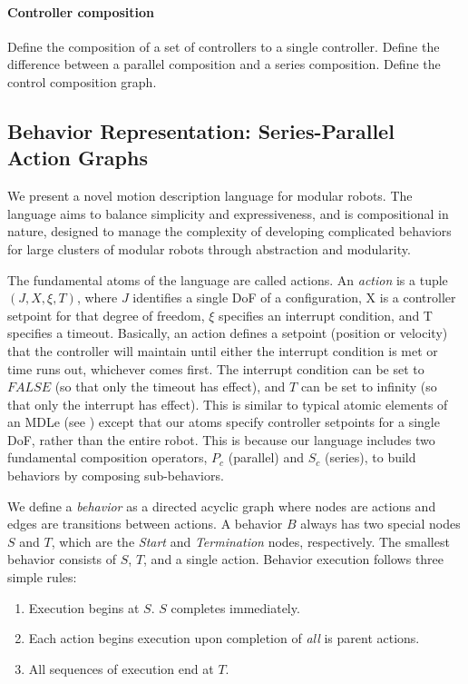 \documentclass[conference]{IEEEtran}
\theoremstyle{definition}
\begin{document}
\paragraph{Controller composition}
Define the composition of a set of controllers to a single controller. Define the difference between a parallel composition and a series composition. Define the control composition graph.

\subsection{Behavior Representation: Series-Parallel Action Graphs}
\label{sec:behavior-representation}
We present a novel motion description language for modular robots.  The
language aims to balance simplicity and expressiveness, and is compositional in
nature, designed to manage the complexity of developing complicated behaviors
for large clusters of modular robots through abstraction and modularity.

The fundamental atoms of the language are called actions.  An \textit{action} is a tuple \(
(J, X, \xi, T)\), where \(J\) identifies a single DoF of a configuration, X is a
controller setpoint for that degree of freedom, \(\xi\) specifies an interrupt
condition, and T specifies a timeout.  Basically, an action defines a setpoint
(position or velocity) that the controller will maintain until either the
interrupt condition is met or time runs out, whichever comes first.  The
interrupt condition can be set to \(FALSE\) (so that only the timeout has effect),
and \(T\) can be set to infinity (so that only the interrupt has effect).  This is
similar to typical atomic elements of an MDLe (see \cite{hristu2003motion}) except that our
atoms specify controller setpoints for a single DoF, rather than the entire
robot.  This is because our language includes two fundamental composition operators,
\(P_c\) (parallel) and \(S_c\) (series), to build behaviors by composing sub-behaviors.

We define a \textit{behavior} as a directed acyclic graph where nodes are actions and
edges are transitions between actions.  A behavior \(B\) always has two
special nodes \(S\) and \(T\), which are the \textit{Start} and \textit{Termination} nodes, respectively.
The smallest behavior consists of \(S\), \(T\), and a single action.  Behavior execution follows three simple rules:

\begin{enumerate}
\item Execution begins at \(S\).  \(S\) completes immediately.
\item Each action begins execution upon completion of \textit{all} is parent actions.
\item All sequences of execution end at \(T\).
\end{enumerate}
\end{document}

